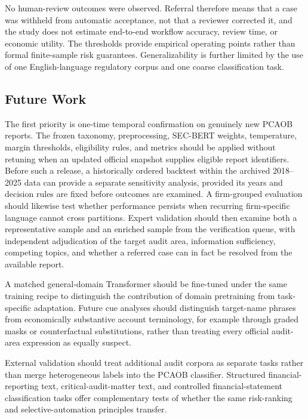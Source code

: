 \documentclass[11pt]{article}
\begin{document}
No human-review outcomes were observed. Referral therefore means that a case was
withheld from automatic acceptance, not that a reviewer corrected it, and the
study does not estimate end-to-end workflow accuracy, review time, or economic
utility. The thresholds provide empirical operating points rather than formal
finite-sample risk guarantees. Generalizability is further limited by the use of
one English-language regulatory corpus and one coarse classification task.

\subsection{Future Work}

The first priority is one-time temporal confirmation on genuinely new PCAOB
reports. The frozen taxonomy, preprocessing, SEC-BERT weights, temperature,
margin thresholds, eligibility rules, and metrics should be applied without
retuning when an updated official snapshot supplies eligible report identifiers.
Before such a release, a historically ordered backtest within the archived
2018--2025 data can provide a separate sensitivity analysis, provided its years
and decision rules are fixed before outcomes are examined. A firm-grouped
evaluation should likewise test whether performance persists when recurring
firm-specific language cannot cross partitions.
Expert validation should then examine both a representative sample and an
enriched sample from the verification queue, with independent adjudication of
the target audit area, information sufficiency, competing topics, and whether a
referred case can in fact be resolved from the available report.

A matched general-domain Transformer should be fine-tuned under the same training
recipe to distinguish the contribution of domain pretraining from task-specific
adaptation. Future cue analyses should distinguish target-name phrases from
economically substantive account terminology, for example through graded masks
or counterfactual substitutions, rather than treating every official audit-area
expression as equally suspect.

External validation should treat additional audit corpora as separate tasks
rather than merge heterogeneous labels into the PCAOB classifier. Structured
financial-reporting text, critical-audit-matter text, and controlled
financial-statement classification tasks offer complementary tests of whether
the same risk-ranking and selective-automation principles transfer.
\end{document}
